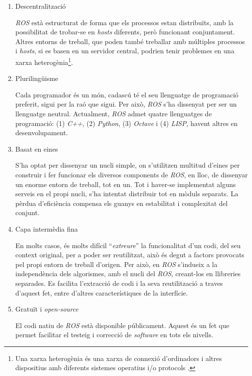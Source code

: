 \documentclass[12pt,a4paper,final,twoside]{article}
\begin{document}
\begin{enumerate}

\item Descentralització

\textit{ROS} està estructurat de forma que els processos estan distribuïts, amb la possibilitat de trobar-se en \textit{hosts} diferents, però funcionant conjuntament. Altres entorns de treball, que poden també treballar amb múltiples processos i \textit{hosts}, si es basen en un servidor central, podrien tenir problemes en una xarxa heterogènia\footnote{Una xarxa heterogènia és una xarxa de connexió d'ordinadors i altres dispositius amb diferents sistemes operatius i/o protocols \cite{Delphinanto2011}.}.

\item Plurilingüisme

Cada programador és un món, cadascú té el seu llenguatge de programació preferit, sigui per la raó que sigui. Per això, \textit{ROS} s'ha dissenyat per ser un llenguatge neutral. Actualment, \textit{ROS} admet quatre llenguatges de programació: (1) \textit{C++}, (2) \textit{Python}, (3) \textit{Octave} i (4) \textit{LISP}, havent altres en desenvolupament.

\item Basat en eines

S'ha optat per dissenyar un nucli simple, on s'utilitzen multitud d'eines per construir i fer funcionar els diversos components de \textit{ROS}, en lloc, de dissenyar un enorme entorn de treball, tot en un. Tot i haver-se implementat alguns serveis en el propi nucli, s'ha intentat distribuir tot en mòduls separats. La pèrdua d'eficiència compensa els guanys en estabilitat i complexitat del conjunt.

\item Capa intermèdia fina

En molts casos, és molts difícil ``\textit{extreure}'' la funcionalitat d'un codi, del seu context original, per a poder ser reutilitzat, això és degut a factors provocats pel propi entorn de treball d'origen. Per això, en \textit{ROS} s'indueix a la independència dels algorismes, amb el nucli del \textit{ROS}, creant-los en llibreries separades. Es facilita l'extracció de codi i la seva reutilització a traves d'aquest fet, entre d'altres característiques de la interfície.

\item Gratuït i \textit{open-source}

El codi natiu de \textit{ROS} està disponible públicament. Aquest és un fet que permet facilitar el testeig i correcció de \textit{software} en tots els nivells. 

\end{enumerate}
\end{document}
